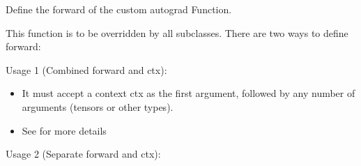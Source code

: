\documentclass[letterpaper,10pt,english]{sphinxmanual}
\begin{document}
\begin{fulllineitems}
\begin{fulllineitems}
\label{\detokenize{dtw_loss_functions.soft_dtw_implementations.soft_dtw_cuda_ron.autograd:dtw_loss_functions.soft_dtw_implementations.soft_dtw_cuda_ron.autograd.SoftDTWAutograd.forward}}
\pysigstartsignatures
\pysiglinewithargsret
{}
{\sphinxparamcomma {}\sphinxparamcomma {}\sphinxparamcomma {}}
{}
\pysigstopsignatures
\sphinxAtStartPar
Define the forward of the custom autograd Function.

\sphinxAtStartPar
This function is to be overridden by all subclasses.
There are two ways to define forward:

\sphinxAtStartPar
Usage 1 (Combined forward and ctx):

\begin{sphinxVerbatim}[commandchars=\\\{\}]
       
\end{sphinxVerbatim}
\begin{itemize}
\item {} 
\sphinxAtStartPar
It must accept a context ctx as the first argument, followed by any
number of arguments (tensors or other types).

\item {} 
\sphinxAtStartPar
See  for more details

\end{itemize}

\sphinxAtStartPar
Usage 2 (Separate forward and ctx):

\begin{sphinxVerbatim}[commandchars=\\\{\}]
     


\end{sphinxVerbatim}
\end{fulllineitems}
\end{fulllineitems}
\end{document}

